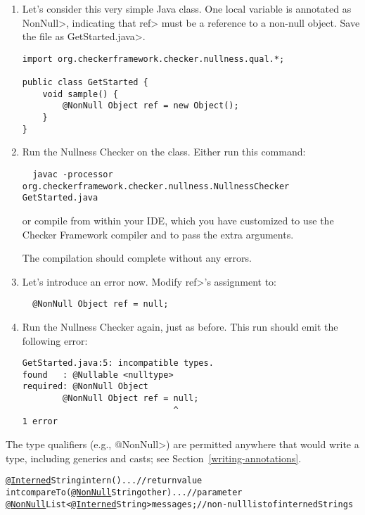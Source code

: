 \begin{enumerate}
\item
  Let's consider this very simple Java class.  One local variable is
  annotated as \<NonNull>, indicating that \<ref> must be a reference to a
  non-null object.  Save the file as \<GetStarted.java>.

\begin{Verbatim}
import org.checkerframework.checker.nullness.qual.*;

public class GetStarted {
    void sample() {
        @NonNull Object ref = new Object();
    }
}
\end{Verbatim}

\item
  Run the Nullness Checker on the class.
  Either run this command:
\begin{Verbatim}
  javac -processor org.checkerframework.checker.nullness.NullnessChecker GetStarted.java
\end{Verbatim}

\noindent
or compile from within your IDE, which you have customized to use the
Checker Framework compiler and to pass the extra arguments.

  The compilation should complete without any errors.

\item
  Let's introduce an error now.  Modify \<ref>'s assignment to:
\begin{Verbatim}
  @NonNull Object ref = null;
\end{Verbatim}

\item
  Run the Nullness Checker again, just as before.  This run should emit
  the following error:
\begin{Verbatim}
GetStarted.java:5: incompatible types.
found   : @Nullable <nulltype>
required: @NonNull Object
        @NonNull Object ref = null;
                              ^
1 error
\end{Verbatim}

\end{enumerate}

The type qualifiers (e.g., \<@NonNull>) are permitted anywhere
that would write a type, including generics and casts; see
Section~\ref{writing-annotations}.

\begin{alltt}
  \underline{@Interned} String intern() \ttlcb{} ... \ttrcb{}             // return value
  int compareTo(\underline{@NonNull} String other) \ttlcb{} ... \ttrcb{}  // parameter
  \underline{@NonNull} List<\underline{@Interned} String> messages;     // non-null list of interned Strings
\end{alltt}


